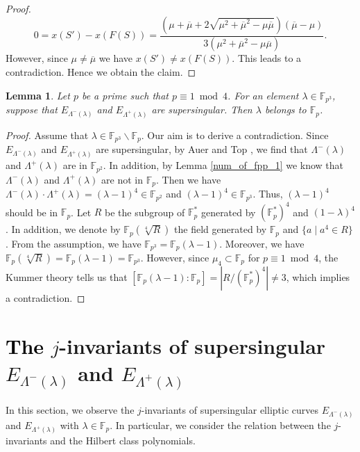 \documentclass[a4paper, 11pt]{article}
\theoremstyle{plain}
\newtheorem{lem}[defn]{Lemma}
\newcommand{\?}{\textcolor{red}{??}}
\newcommand{\lm}{\lambda}
\newcommand{\Lm}{\Lambda}
\newcommand{\fp}{\mathbb{F}_p}
\newcommand{\fpp}{\mathbb{F}_{p^2}}
\begin{document}
\begin{proof}
\[
0=x(S')-x(F(S))=\frac{\left(\mu+\overline{\mu}+2\sqrt{\mu^2+\overline{\mu}^2-\mu\overline{\mu}}\right)\left(\overline{\mu}-\mu\right)}{3(\mu^2+\overline{\mu}^2-\mu\overline{\mu})}.
\]
However, since $\mu \ne \overline{\mu}$ we have $x(S')\ne x(F(S))$. This leads to a contradiction. 
Hence we obtain the claim. 
\end{proof}

\begin{lem}
\label{not-fp3rational}
   Let $p$ be a prime such that $p \equiv1 \bmod 4$. For an element $\lm \in {\mathbb{F}}_{p^3}$, suppose that $E_{\Lm^{-}(\lm)}$ and $E_{{\Lm^{+}(\lm)}}$ are supersingular. Then $\lm$ belongs to $\fp$.
\end{lem}

\begin{proof}
Assume that $\lm \in {\mathbb{F}}_{p^3} \smallsetminus\fp$. Our aim is to derive a contradiction. Since $E_{\Lm^{-}(\lm)}$ and $E_{\Lm^{+}(\lm)}$ are supersingular, by Auer and Top \cite[Proposition 2.2]{AT02}, we find that $\Lm^{-}(\lm)$ and ${\Lm^{+}(\lm)}$ are in $\fpp$. In addition, by Lemma \ref{num_of_fpp_1} we know that $\Lm^{-}(\lm)$ and ${\Lm^{+}(\lm)}$ are not in $\fp$.  Then we have $\Lm^{-}(\lm) \cdot {\Lm^{+}(\lm)} =(\lm-1)^4 \in \fpp$ and $(\lm-1)^4 \in {\mathbb{F}}_{p^3}$. Thus, $(\lm-1)^4 $ should be in $\fp$. Let $R$ be the subgroup of $\fp^*$ generated by $\left(\fp^*\right)^4$ and $(1-\lm)^4$.  In addition, we denote by $\fp(\sqrt[4]{R})$ the field generated by $\fp$ and $\{a \mid a^4\in R\}$.  From the assumption, we have ${\mathbb{F}}_{p^3}=\fp(\lm-1)$.  Moreover, we have $\fp(\sqrt[4]{R})=\fp(\lm-1)={\mathbb{F}}_{p^3}$. However, since $\mu_4\subset\fp$ for $p \equiv1 \bmod 4$, the Kummer theory tells us that $[\fp(\lm-1):\fp]=\left|R/\left(\fp^*\right)^4\right|\ne 3$, which implies a contradiction.  
\end{proof}


\section{\textcolor{black}{The} $j$-invariants of supersingular $E_{\Lm^{-}(\lm)}$ and $E_{\Lm^{+}(\lm)}$ }
\label{the-important}
In this section, we observe the $j$-invariants of supersingular elliptic curves $E_{\Lm^{-}(\lm)}$ and $E_{\Lm^{+}(\lm)}$ with $\lm \in \fp$. In particular, we consider the relation between the $j$-invariants and the Hilbert class polynomials.
\end{document}
